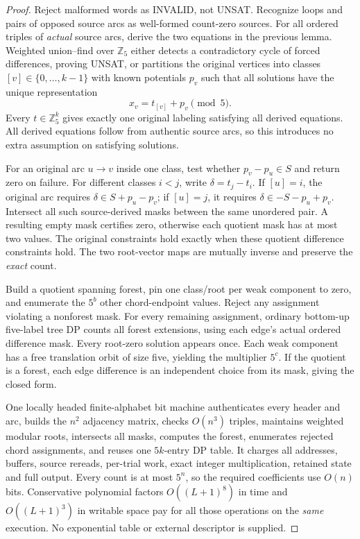\documentclass[11pt]{article}
\begin{document}
\begin{proof}
Reject malformed words as INVALID, not UNSAT. Recognize loops
and pairs of opposed source arcs as well-formed count-zero
sources. For all ordered triples of \emph{actual} source arcs,
derive the two equations in the previous lemma. Weighted
union--find over $\mathbb Z_5$ either detects a contradictory
cycle of forced differences, proving UNSAT, or partitions the
original vertices into classes $[v]\in\{0,\ldots,k-1\}$ with
known potentials $p_v$ such that all solutions have the unique
representation
\[
 x_v=t_{[v]}+p_v\pmod5.
\]
Every $t\in\mathbb Z_5^k$ gives exactly one original labeling
satisfying all derived equations. All derived equations follow
from authentic source arcs, so this introduces no extra
assumption on satisfying solutions.

For an original arc $u\to v$ inside one class, test whether
$p_v-p_u\in S$ and return zero on failure.
For different classes $i<j$, write $\delta=t_j-t_i$.
If $[u]=i$, the original arc requires
$\delta\in S+p_u-p_v$; if $[u]=j$, it requires
$\delta\in-S-p_u+p_v$.
Intersect all such source-derived masks between the same
unordered pair. A resulting empty mask certifies zero,
otherwise each quotient mask has at most two values.
The original constraints hold exactly when these quotient
difference constraints hold. The two root-vector maps are
mutually inverse and preserve the \emph{exact} count.

Build a quotient spanning forest, pin one class/root per weak
component to zero, and enumerate the $5^b$ other chord-endpoint
values. Reject any assignment violating a nonforest mask.
For every remaining assignment, ordinary bottom-up five-label
tree DP counts all forest extensions, using each edge's
actual ordered difference mask. Every root-zero solution
appears once. Each weak component has a free translation
orbit of size five, yielding the multiplier $5^c$.
If the quotient is a forest, each edge difference is an
independent choice from its mask, giving the closed form.

One locally headed finite-alphabet bit machine authenticates
every header and arc, builds the $n^2$ adjacency matrix,
checks $O(n^3)$ triples, maintains weighted modular roots,
intersects all masks, computes the forest, enumerates rejected
chord assignments, and reuses one $5k$-entry DP table. It
charges all addresses, buffers, source rereads, per-trial work,
exact integer multiplication, retained state and full output.
Every count is at most $5^n$, so the required coefficients use
$O(n)$ bits. Conservative polynomial factors $O((L+1)^8)$
in time and $O((L+1)^3)$ in writable space pay for all those
operations on the \emph{same} execution. No exponential table
or external descriptor is supplied.
\end{proof}
\end{document}
